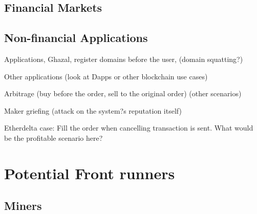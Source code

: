 \subsection{Financial Markets}




\subsection{Non-financial Applications}
Applications, Ghazal, register domains before the user, (domain squatting?) \par\noindent
Other applications (look at Dapps or other blockchain use cases)\par\noindent
Arbitrage (buy before the order, sell to the original order) (other scenarios)\par\noindent
Maker griefing (attack on the system?s reputation itself)\par\noindent
Etherdelta case: Fill the order when cancelling transaction is sent. What would be the profitable scenario here?







\section{Potential Front runners} %





\subsection{Miners}

